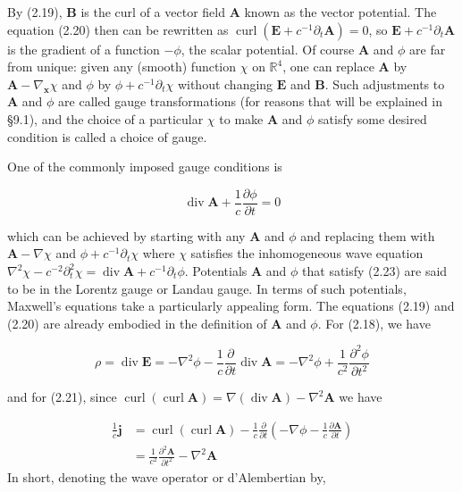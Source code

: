\documentclass[10pt, letterpaper]{article}
\begin{document}
By (2.19), $\mathbf{B}$ is the curl of a vector field $\mathbf{A}$ known as the vector potential. The equation (2.20) then can be rewritten as $\operatorname{curl}\left(\mathbf{E}+c^{-1} \partial_{t} \mathbf{A}\right)=0$, so $\mathbf{E}+c^{-1} \partial_{t} \mathbf{A}$ is the gradient of a function $-\phi$, the scalar potential. Of course $\mathbf{A}$ and $\phi$ are far from unique: given any (smooth) function $\chi$ on $\mathbb{R}^{4}$, one can replace $\mathbf{A}$ by $\mathbf{A}-\nabla_{\mathbf{x}} \chi$ and $\phi$ by $\phi+c^{-1} \partial_{t} \chi$ without changing $\mathbf{E}$ and $\mathbf{B}$. Such adjustments to $\mathbf{A}$ and $\phi$ are called gauge transformations (for reasons that will be explained in §9.1), and the choice of a particular $\chi$ to make $\mathbf{A}$ and $\phi$ satisfy some desired condition is called a choice of gauge.

One of the commonly imposed gauge conditions is

$$
\operatorname{div} \mathbf{A}+\frac{1}{c} \frac{\partial \phi}{\partial t}=0
$$

which can be achieved by starting with any $\mathbf{A}$ and $\phi$ and replacing them with $\mathbf{A}-\nabla \chi$ and $\phi+c^{-1} \partial_{t} \chi$ where $\chi$ satisfies the inhomogeneous wave equation $\nabla^{2} \chi-c^{-2} \partial_{t}^{2} \chi= \operatorname{div} \mathbf{A}+c^{-1} \partial_{t} \phi$. Potentials $\mathbf{A}$ and $\phi$ that satisfy (2.23) are said to be in the Lorentz gauge or Landau gauge. In terms of such potentials, Maxwell's equations take a particularly appealing form. The equations (2.19) and (2.20) are already embodied in the definition of $\mathbf{A}$ and $\phi$. For (2.18), we have

$$
\rho=\operatorname{div} \mathbf{E}=-\nabla^{2} \phi-\frac{1}{c} \frac{\partial}{\partial t} \operatorname{div} \mathbf{A}=-\nabla^{2} \phi+\frac{1}{c^{2}} \frac{\partial^{2} \phi}{\partial t^{2}}
$$

and for (2.21), since $\operatorname{curl}(\operatorname{curl} \mathbf{A})=\nabla(\operatorname{div} \mathbf{A})-\nabla^{2} \mathbf{A}$ we have

$$
\begin{aligned}
\frac{1}{c} \mathbf{j} & =\operatorname{curl}(\operatorname{curl} \mathbf{A})-\frac{1}{c} \frac{\partial}{\partial t}\left(-\nabla \phi-\frac{1}{c} \frac{\partial \mathbf{A}}{\partial t}\right) \\
& =\frac{1}{c^{2}} \frac{\partial^{2} \mathbf{A}}{\partial t^{2}}-\nabla^{2} \mathbf{A}
\end{aligned}
$$
In short, denoting the wave operator or d'Alembertian by,
\end{document}
